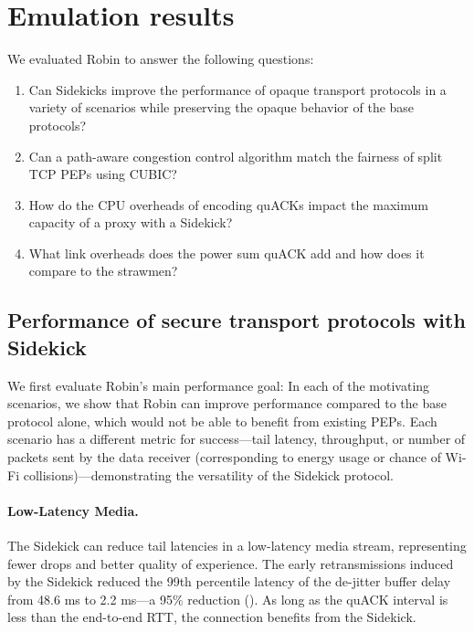 \section{Emulation results}
\label{sec:sidekick:emulation}




We evaluated Robin to answer the following questions:
\begin{enumerate}[noitemsep,topsep=0pt]
	\item Can Sidekicks improve the performance of opaque transport protocols
	in a variety of scenarios while preserving the opaque behavior of the
	base protocols?
	\item Can a path-aware congestion control algorithm match the fairness of
	split TCP PEPs using CUBIC?
	\item How do the CPU overheads of encoding quACKs impact the maximum
	capacity of a proxy with a Sidekick?
	\item What link overheads does the power sum quACK add and how does it
	compare to the strawmen?
\end{enumerate}

\subsection{Performance of secure transport protocols with Sidekick}
\label{sec:sidekick:emulation:performance}

We first evaluate Robin's main performance goal: In each of the motivating
scenarios, we show that Robin can improve performance compared to the base
protocol alone, which would not be able to benefit from existing PEPs.
Each scenario has a different metric for success---tail latency, throughput,
or number of packets sent by the data receiver (corresponding to energy usage
or chance of Wi-Fi collisions)---demonstrating the versatility of the Sidekick
protocol.

\paragraph{Low-Latency Media.}
The Sidekick can reduce tail latencies in a low-latency media stream, representing
fewer drops and better quality of experience.
The early retransmissions induced by the Sidekick reduced the 99th percentile
latency of the de-jitter buffer delay from 48.6 ms to 2.2 ms---a 95\%
reduction ().
As long as the quACK interval is less than the end-to-end RTT, the connection
benefits from the Sidekick.

